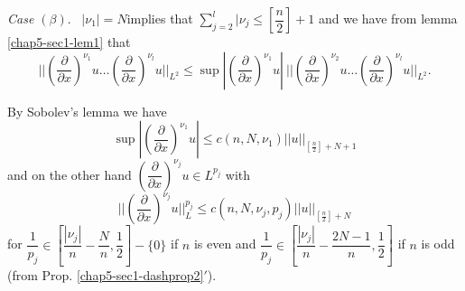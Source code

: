 \noindent
\textit{Case $(\beta)$}.~ $| \nu_1| = N$\pageoriginale implies that $\sum
\limits^l_{j=2} | \nu_j \leq \left[\dfrac{n}{2} \right]+1$ and we have
from lemma \ref{chap5-sec1-lem1} that 
$$
|| \left(\frac{\partial}{\partial x}\right)^{\nu_1} u \ldots
\left(\frac{\partial}{\partial x}\right)^{\nu_l} u ||_{L^2} \leq \sup |
\left(\frac{\partial}{\partial x}\right)^{\nu_1} u |~ ||
\left(\frac{\partial}{\partial x}\right)^{\nu_2} u \ldots
\left(\frac{\partial}{\partial x}\right)^{\nu_l} u ||_{L^2}. 
$$

By Sobolev's lemma we have
$$
\sup | \left(\frac{\partial}{\partial x}\right)^{\nu_1} u | \leq c(n,
N, \nu_1) || u ||_{\left[\frac{n}{2} \right]+N+1} 
$$
and on the other hand $\left(\dfrac{\partial}{\partial x}\right)^{\nu_j} u
\in L^{p_j}$ with 
$$
|| \left(\frac{\partial}{\partial x}\right)^{\nu_j} u ||_L^{p_j} \leq c(n, N,
\nu_j, p_j) || u ||_{\left[\frac{n}{2} \right] + N} 
$$
for  $\dfrac{1}{p_j} \in \left[ \dfrac{| \nu_j|}{n} -
  \dfrac{N}{n}, \dfrac{1}{2}\right]- \{ 0 \} $ if  $n$ is even and
$\dfrac{1}{p_j} \in \left[ \dfrac{| \nu_j|}{n} -
  \dfrac{2N-1}{n}, \dfrac{1}{2}\right]$ if $n$  is odd (from
Prop. \ref{chap5-sec1-dashprop2}$'$). 

